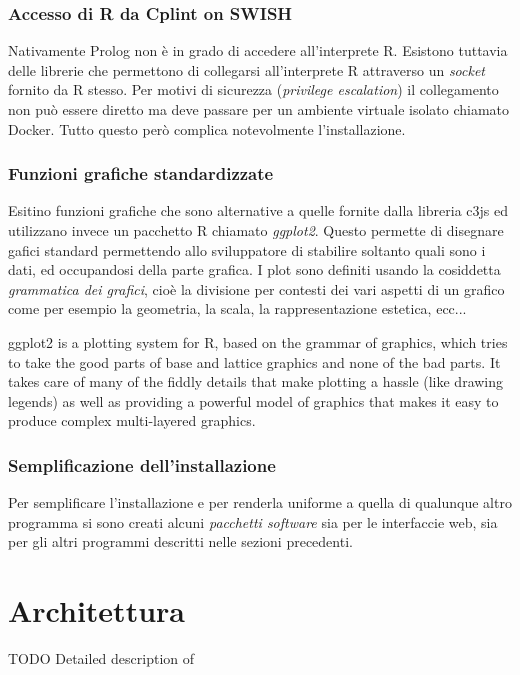 \documentclass[10pt,titlepage,twoside,a4paper]{report}
\begin{document}
        \subsection{Accesso di R da Cplint on SWISH}
Nativamente Prolog non è in grado di accedere all'interprete R. Esistono 
tuttavia delle librerie che permettono di collegarsi all'interprete R
attraverso un \emph{socket} fornito da R stesso. Per motivi di sicurezza 
(\emph{privilege escalation}) il collegamento non può essere diretto ma deve 
passare per un ambiente virtuale isolato chiamato Docker. Tutto questo però 
complica notevolmente l'installazione.

        \subsection{Funzioni grafiche standardizzate}
Esitino funzioni grafiche che sono alternative a quelle fornite dalla libreria 
c3js ed utilizzano invece un pacchetto R chiamato \emph{ggplot2}. Questo 
permette di disegnare gafici standard permettendo allo sviluppatore di 
stabilire soltanto quali sono i dati, ed occupandosi della parte grafica. 
I plot sono definiti usando la cosiddetta \emph{grammatica dei 
grafici}, cioè la divisione per contesti dei vari aspetti di un grafico come 
per esempio la geometria, la scala, la rappresentazione estetica, ecc... 
\cite{grammarOfGraphics} 
\cite{ggplot2}

\begin{displayquote}
ggplot2 is a plotting system for R, based on the grammar of graphics, which 
tries to take the good parts of base and lattice graphics and none of the bad 
parts. It takes care of many of the fiddly details that make plotting a hassle 
(like drawing legends) as well as providing a powerful model of graphics that 
makes it easy to produce complex multi-layered graphics.
\end{displayquote}

        \subsection{Semplificazione dell'installazione}
Per semplificare l'installazione e per renderla uniforme a quella di qualunque 
altro programma si sono creati alcuni \emph{pacchetti software} sia per 
le interfaccie web, sia per gli altri programmi descritti nelle sezioni 
precedenti.




\chapter{Architettura}
TODO
Detailed description of
\end{document}
